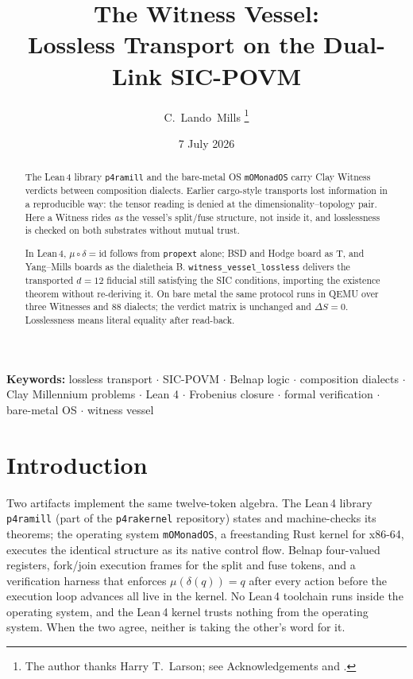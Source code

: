 \documentclass[12pt,a4paper]{article}
\newcommand{\Lean}{\textsf{Lean}\,4}
\newcommand{\bT}{\textsf{T}}
\newcommand{\bB}{\textsf{B}}
\begin{document}
\title{\textbf{The Witness Vessel:\\
Lossless Transport on the Dual-Link SIC-POVM}}

\author{C.\ Lando\ Mills%
\thanks{The author thanks Harry T.\ Larson; see Acknowledgements and \cite{Larson1961}.}}

\date{7 July 2026}

\maketitle

\begin{abstract}
The \Lean{} library \texttt{p4ramill} and the bare-metal OS \texttt{mOMonadOS}
carry Clay Witness verdicts between composition dialects.  Earlier cargo-style
transports lost information in a reproducible way: the tensor reading is denied
at the dimensionality--topology pair.  Here a Witness rides \emph{as} the vessel's
split/fuse structure, not inside it, and losslessness is checked on both
substrates without mutual trust.

In \Lean{}, $\mu\circ\delta=\mathrm{id}$ follows from \texttt{propext} alone;
BSD and Hodge board as \bT{}, and Yang--Mills boards as the dialetheia \bB{}.
\texttt{witness\_vessel\_lossless} delivers the transported $d=12$ fiducial
still satisfying the SIC conditions, importing the existence theorem without
re-deriving it.  On bare metal the same protocol runs in QEMU over three
Witnesses and $88$ dialects; the verdict matrix is unchanged and $\Delta S=0$.
Losslessness means literal equality after read-back.
\end{abstract}

\noindent\textbf{Keywords:} lossless transport \(\cdot\) SIC-POVM \(\cdot\)
Belnap logic \(\cdot\) composition dialects \(\cdot\) Clay Millennium problems
\(\cdot\) Lean 4 \(\cdot\) Frobenius closure \(\cdot\) formal verification
\(\cdot\) bare-metal OS \(\cdot\) witness vessel

\newpage
\tableofcontents
\newpage

\section{Introduction}

Two artifacts implement the same twelve-token algebra.  The \Lean{} library
\texttt{p4ramill} (part of the \texttt{p4rakernel} repository) states and
machine-checks its theorems; the operating system \texttt{mOMonadOS}, a
freestanding Rust kernel for x86-64, executes the identical structure as its
native control flow.  Belnap four-valued registers, fork/join execution frames
for the split and fuse tokens, and a verification harness that enforces
$\mu(\delta(q)) = q$ after every action before the execution loop advances all
live in the kernel.  No \Lean{} toolchain runs inside the operating system, and
the \Lean{} kernel trusts nothing from the operating system.  When the two
agree, neither is taking the other's word for it.
\end{document}
